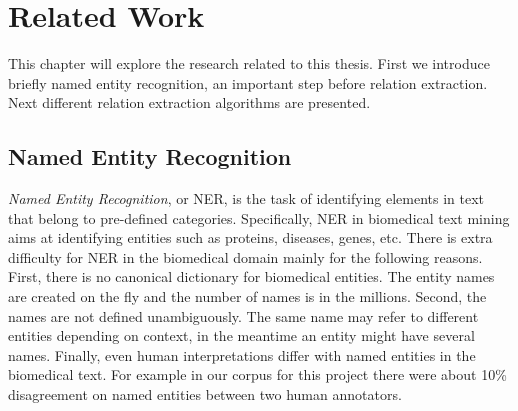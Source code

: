 \chapter{Related Work}  %

\ifpdf
    \graphicspath{{Background/Figs/Raster/}{Background/Figs/PDF/}{Background/Figs/}}
\else
    \graphicspath{{Background/Figs/Vector/}{Background/Figs/}}
\fi
This chapter will explore the research related to this thesis. First we introduce briefly named entity recognition, an important step before relation extraction. Next different relation extraction algorithms are presented.
\section{Named Entity Recognition} \label{2.1}%
\emph{Named Entity Recognition}, or NER, is the task of identifying elements in text that belong to pre-defined categories. Specifically, NER in biomedical text mining aims at identifying entities such as proteins, diseases, genes, etc. There is extra difficulty for NER in the biomedical domain mainly for the following reasons. First, there is no canonical dictionary for biomedical entities\cite{cohen2005survey}. The entity names are created on the fly and the number of names is in the millions. Second, the names are not defined unambiguously\cite{wilbur2007biocreative}. The same name may refer to different entities depending on context, in the meantime an entity might have several names. Finally, even human interpretations differ with named entities in the biomedical text. For example in our corpus for this project there were about 10\% disagreement on named entities between two human annotators\cite{verspoor2013annotating}.
